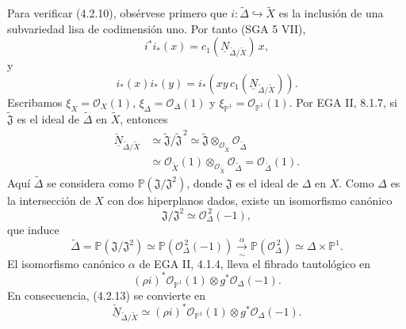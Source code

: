 \pageoriginale

Para verificar (4.2.10), obsérvese primero que
$i:\widetilde\Delta\hookrightarrow\widetilde X$ es la inclusión de una
subvariedad lisa de codimensión uno. Por tanto (SGA 5 VII),
\begin{equation}\tag{4.2.11}
i^*i_*(x)=c_1(\underline N_{\widetilde\Delta/\widetilde X})\,x,
\end{equation}
y
\begin{equation}\tag{4.2.12}
i_*(x)i_*(y)
=i_*\!\left(xy\,c_1(\underline N_{\widetilde\Delta/\widetilde X})\right).
\end{equation}
Escribamos
$\xi_X=\mathcal O_X(1)$,
$\xi_\Delta=\mathcal O_\Delta(1)$ y
$\xi_{\mathbb P^1}=\mathcal O_{\mathbb P^1}(1)$.
Por EGA II, 8.1.7, si $\widetilde{\mathfrak J}$ es el ideal de
$\widetilde\Delta$ en $\widetilde X$, entonces
\begin{equation}\tag{4.2.13}
\begin{aligned}
\underline{\check N}_{\widetilde\Delta/\widetilde X}
&\simeq\widetilde{\mathfrak J}/\widetilde{\mathfrak J}^{\,2}
 \simeq\widetilde{\mathfrak J}
       \otimes_{\mathcal O_{\widetilde X}}
       \mathcal O_{\widetilde\Delta}\\
&\simeq\mathcal O_{\widetilde X}(1)
       \otimes_{\mathcal O_{\widetilde X}}
       \mathcal O_{\widetilde\Delta}
 =\mathcal O_{\widetilde\Delta}(1).
\end{aligned}
\end{equation}
Aquí $\widetilde\Delta$ se considera como
$\mathbb P(\mathfrak J/\mathfrak J^2)$, donde $\mathfrak J$ es el
ideal de $\Delta$ en $X$. Como $\Delta$ es la intersección de $X$ con
dos hiperplanos dados, existe un isomorfismo canónico
\[
\mathfrak J/\mathfrak J^2\simeq\mathcal O_\Delta^{\,2}(-1),
\]
que induce
\[
\widetilde\Delta=\mathbb P(\mathfrak J/\mathfrak J^2)
\simeq\mathbb P(\mathcal O_\Delta^{\,2}(-1))
\xrightarrow[\sim]{\alpha}
\mathbb P(\mathcal O_\Delta^{\,2})
\simeq\Delta\times\mathbb P^1.
\]
El isomorfismo canónico $\alpha$ de EGA II, 4.1.4, lleva el fibrado
tautológico en
\[
(\rho i)^*\mathcal O_{\mathbb P^1}(1)
\otimes g^*\mathcal O_\Delta(-1).
\]
En consecuencia, (4.2.13) se convierte en
\begin{equation}\tag{4.2.14}
\underline{\check N}_{\widetilde\Delta/\widetilde X}
\simeq(\rho i)^*\mathcal O_{\mathbb P^1}(1)
       \otimes g^*\mathcal O_\Delta(-1).
\end{equation}

\pageoriginale

